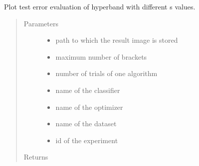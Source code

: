 \documentclass[letterpaper,10pt,english]{sphinxmanual}
\begin{document}
\begin{fulllineitems}
\label{\detokenize{index:plots.plot_hyperband}}
Plot test error evaluation of hyperband with different s values.
\begin{quote}\begin{description}
\item[{Parameters}] \leavevmode\begin{itemize}
\item {} 
 \textendash{} path to which the result image is stored

\item {} 
 \textendash{} maximum number of brackets

\item {} 
 \textendash{} number of trials of one algorithm

\item {} 
 \textendash{} name of the classifier

\item {} 
 \textendash{} name of the optimizer

\item {} 
 \textendash{} name of the dataset

\item {} 
 \textendash{} id of the experiment

\end{itemize}

\item[{Returns}] \leavevmode


\end{description}\end{quote}

\end{fulllineitems}

\end{document}
